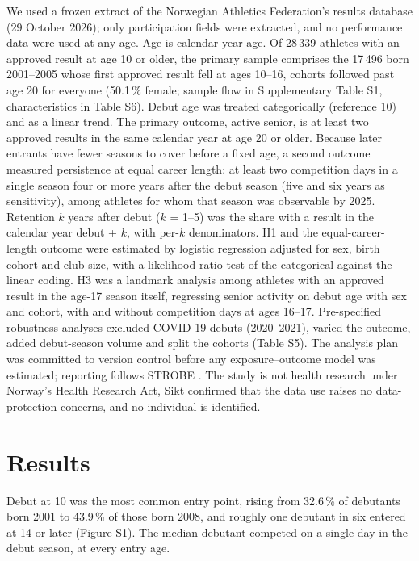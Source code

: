 \documentclass[12pt,a4paper]{article}
\begin{document}
We used a frozen extract of the Norwegian Athletics Federation's results database (29 October 2026); only participation fields were extracted, and no performance data were used at any age. Age is calendar-year age. Of 28\,339 athletes with an approved result at age 10 or older, the primary sample comprises the 17\,496 born 2001--2005 whose first approved result fell at ages 10--16, cohorts followed past age 20 for everyone (50.1\,\% female; sample flow in Supplementary Table S1, characteristics in Table S6). Debut age was treated categorically (reference 10) and as a linear trend. The primary outcome, active senior, is at least two approved results in the same calendar year at age 20 or older. Because later entrants have fewer seasons to cover before a fixed age, a second outcome measured persistence at equal career length: at least two competition days in a single season four or more years after the debut season (five and six years as sensitivity), among athletes for whom that season was observable by 2025. Retention $k$ years after debut ($k$ = 1--5) was the share with a result in the calendar year debut + $k$, with per-$k$ denominators. H1 and the equal-career-length outcome were estimated by logistic regression adjusted for sex, birth cohort and club size, with a likelihood-ratio test of the categorical against the linear coding. H3 was a landmark analysis \cite{anderson1983} among athletes with an approved result in the age-17 season itself, regressing senior activity on debut age with sex and cohort, with and without competition days at ages 16--17. Pre-specified robustness analyses excluded COVID-19 debuts (2020--2021), varied the outcome, added debut-season volume and split the cohorts (Table S5). The analysis plan was committed to version control before any exposure--outcome model was estimated; reporting follows STROBE \cite{vonelm2007}. The study is not health research under Norway's Health Research Act, Sikt confirmed that the data use raises no data-protection concerns, and no individual is identified.

\section{Results}

Debut at 10 was the most common entry point, rising from 32.6\,\% of debutants born 2001 to 43.9\,\% of those born 2008, and roughly one debutant in six entered at 14 or later (Figure S1). The median debutant competed on a single day in the debut season, at every entry age.
\end{document}
